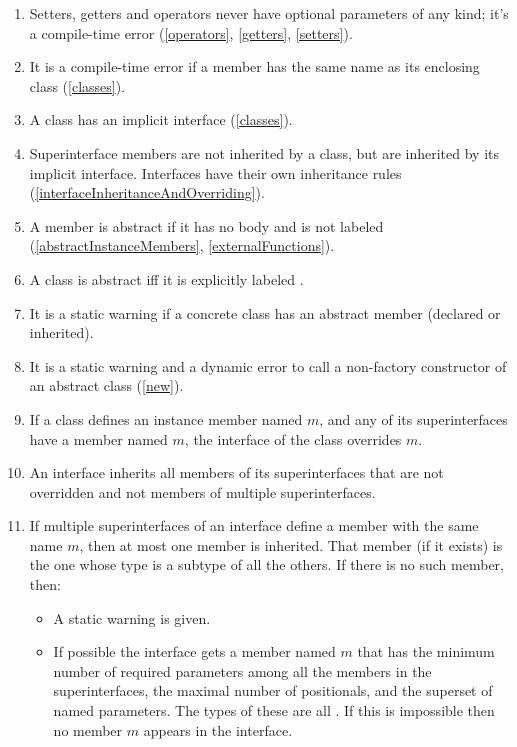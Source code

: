 \documentclass{article}
\begin{document}
{\begin{enumerate}
If two members override each other, it is a static warning if the overriding member does not have all the named parameters that the overridden one has (\ref{instanceMethods}).
\item Setters, getters and operators never have optional parameters of any kind; it's a compile-time error (\ref{operators}, \ref{getters}, \ref{setters}).
\item It is a compile-time error if a member has the same name as its enclosing class (\ref{classes}).
\item A class has an implicit interface (\ref{classes}).
\item Superinterface members are not inherited by a class, but are inherited by its implicit interface. Interfaces have their own inheritance rules (\ref{interfaceInheritanceAndOverriding}).
\item A member is abstract if it has no body and is not labeled \EXTERNAL{} (\ref{abstractInstanceMembers}, \ref{externalFunctions}).
\item A class is abstract iff it is explicitly labeled \ABSTRACT{}.%
\item It is a static warning if a concrete class has an abstract member (declared or inherited).
\item It is a static warning and a dynamic error to call a non-factory constructor of an abstract class  (\ref{new}).
\item If a class defines an instance member named $m$, and any of its superinterfaces have a  member named $m$, the interface of the class overrides $m$.
\item  An interface inherits all  members of its superinterfaces that are not overridden and not members of multiple superinterfaces.
\item  If multiple superinterfaces of an interface define a member with the same name $m$, then at most one member is inherited. That member (if it exists) is the one whose type is a subtype of all the others. If there is no such member, then:
\begin{itemize}
  \item  A static warning is given.
  \item  If possible the interface gets a member named $m$ that has the minimum number of required parameters among all the members in the superinterfaces, the maximal number of    positionals, and the superset of named parameters.  The types of these are all \DYNAMIC{}. If this is impossible then no member $m$ appears in the interface.

\end{itemize}
\end{enumerate}}
\end{document}
